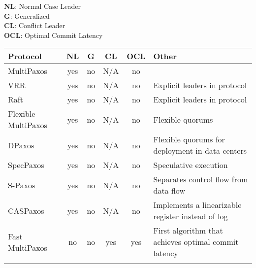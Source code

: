 \textbf{NL}: Normal Case Leader \\
\textbf{G}: Generalized \\
\textbf{CL}: Conflict Leader \\
\textbf{OCL}: Optimal Commit Latency

\newcommand{\yes}{yes}
\newcommand{\no}{no}
\newcommand{\na}{N/A}

\begin{center}
  \begin{tabular}{p{2.5in}ccccp{7.5in}}
    \toprule
    \textbf{Protocol}            & \textbf{NL} & \textbf{G} & \textbf{CL} & \textbf{OCL} & \textbf{Other}                                                       \\ \midrule
    MultiPaxos                   & \yes        & \no        & \na         & \no          &                                                                      \\ \rowcolor{flatgray!30}
    VRR                          & \yes        & \no        & \na         & \no          & Explicit leaders in protocol                                         \\
    Raft                         & \yes        & \no        & \na         & \no          & Explicit leaders in protocol                                         \\ \rowcolor{flatgray!30}
    Flexible \newline MultiPaxos & \yes        & \no        & \na         & \no          & Flexible quorums                                                     \\
    DPaxos                       & \yes        & \no        & \na         & \no          & Flexible quorums for deployment in data centers                      \\ \rowcolor{flatgray!30}
    SpecPaxos                    & \yes        & \no        & \na         & \no          & Speculative execution                                                \\
    S-Paxos                      & \yes        & \no        & \na         & \no          & Separates control flow from data flow                                \\ \rowcolor{flatgray!30}
    CASPaxos                     & \yes        & \no        & \na         & \no          & Implements a linearizable register instead of log                    \\
    Fast \newline MultiPaxos     & \no         & \no        & \yes        & \yes         & First algorithm that achieves optimal commit latency                 \\ \rowcolor{flatgray!30}

\end{tabular}
\end{center}
